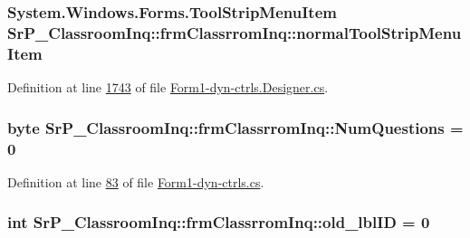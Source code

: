 \hypertarget{class_sr_p___classroom_inq_1_1frm_classrrom_inq_a19933124599a8ff87bd0d7fd10808c4e}{
\subsubsection[{normal\-Tool\-Strip\-Menu\-Item}]{\setlength{\rightskip}{0pt plus 5cm}\-System.\-Windows.\-Forms.\-Tool\-Strip\-Menu\-Item {\bf \-Sr\-P\-\_\-\-Classroom\-Inq\-::frm\-Classrrom\-Inq\-::normal\-Tool\-Strip\-Menu\-Item}}}
\label{class_sr_p___classroom_inq_1_1frm_classrrom_inq_a19933124599a8ff87bd0d7fd10808c4e}


\-Definition at line \hyperlink{_form1-dyn-ctrls_8_designer_8cs_source_l01743}{1743} of file \hyperlink{_form1-dyn-ctrls_8_designer_8cs_source}{\-Form1-\/dyn-\/ctrls.\-Designer.\-cs}.

\hypertarget{class_sr_p___classroom_inq_1_1frm_classrrom_inq_a7e4d497088afdd32623b3b54749210a0}{
\subsubsection[{\-Num\-Questions}]{\setlength{\rightskip}{0pt plus 5cm}byte {\bf \-Sr\-P\-\_\-\-Classroom\-Inq\-::frm\-Classrrom\-Inq\-::\-Num\-Questions} = 0}}
\label{class_sr_p___classroom_inq_1_1frm_classrrom_inq_a7e4d497088afdd32623b3b54749210a0}


\-Definition at line \hyperlink{_form1-dyn-ctrls_8cs_source_l00083}{83} of file \hyperlink{_form1-dyn-ctrls_8cs_source}{\-Form1-\/dyn-\/ctrls.\-cs}.

\hypertarget{class_sr_p___classroom_inq_1_1frm_classrrom_inq_ac56e0f039ce0113331d9bdd322b30827}{
\subsubsection[{old\-\_\-lbl\-I\-D}]{\setlength{\rightskip}{0pt plus 5cm}int {\bf \-Sr\-P\-\_\-\-Classroom\-Inq\-::frm\-Classrrom\-Inq\-::old\-\_\-lbl\-I\-D} = 0}}
\label{class_sr_p___classroom_inq_1_1frm_classrrom_inq_ac56e0f039ce0113331d9bdd322b30827}


